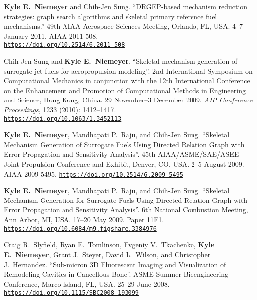 \documentclass[margin,line,11pt]{res}
\makeatletter
\newlength{\bibhang}
\newlength{\bibsep}
 {\@listi \global\bibsep\itemsep \global\advance\bibsep by\parsep}
\newenvironment{bibenum*}
  {\renewcommand\labelenumi{\theenumi.}%
   \etaremune[
     topsep=0pt,
     itemsep=\bibsep,
     parsep=0pt,partopsep=0pt,
     itemindent=-\bibhang,
     leftmargin={\bibhang+\widthof{[999]}}]}
  {\endetaremune}
\newcommand*{\doi}[1]{\href{https://doi.org/#1}{\nolinkurl{https://doi.org/#1}}}
\makeatother
\begin{document}
\begin{resume}
\begin{bibenum*}
\item \textbf{Kyle E.~Niemeyer} and Chih-Jen Sung.
``DRGEP-based mechanism reduction strategies: graph search algorithms and skeletal primary reference fuel mechanisms.''
49th AIAA Aero\-space Sciences Meeting, Orlando, FL, USA.
4--7 January 2011.
AIAA 2011-508. \\
\doi{10.2514/6.2011-508}

\item Chih-Jen Sung and \textbf{Kyle E.~Niemeyer}.
``Skeletal mechanism generation of surrogate jet fuels for aeropropulsion modeling''.
2nd International Symposium on Computational Mechanics in conjunction with the 12th International Conference on the Enhancement and Promotion of Computational Methods in Engineering and Science, Hong Kong, China.
29 November--3 December 2009.
\emph{AIP Conference Proceedings}, 1233 (2010): 1412--1417. \\
\doi{10.1063/1.3452113}


\item \textbf{Kyle E.~Niemeyer}, Mandhapati P.\ Raju, and Chih-Jen Sung.
``Skeletal Mechanism Generation of Surrogate Fuels Using Directed Relation Graph with Error Propagation and Sensitivity Analysis''.
45th AIAA\slash ASME\slash SAE\slash ASEE Joint Propulsion Conference and Exhibit, Denver, CO, USA.
2--5 August 2009.
AIAA 2009-5495.
\doi{10.2514/6.2009-5495}

\item \textbf{Kyle E.~Niemeyer}, Mandhapati P.\ Raju, and Chih-Jen Sung.
``Skeletal Mechanism Generation for Surrogate Fuels Using Directed Relation Graph with Error Propagation and Sensitivity Analysis''.
6th National Combustion Meeting, Ann Arbor, MI, USA.
17--20 May 2009.
Paper 11F1.
\doi{10.6084/m9.figshare.3384976}

\item Craig R.\ Slyfield, Ryan E.\ Tomlinson,  Evgeniy V.\ Tkachenko, \textbf{Kyle E.~Niemeyer}, Grant J.\ Steyer, David L.\ Wilson, and Christopher J.\ Hernandez.
``Sub-micron 3D Fluorescent Imaging and Visualization of Remodeling Cavities in Cancellous Bone''.
ASME Summer Bioengineering Conference, Marco Island, FL, USA.
25--29 June 2008. \\
\doi{10.1115/SBC2008-193099}

\end{bibenum*}


\end{resume}
\end{document}
